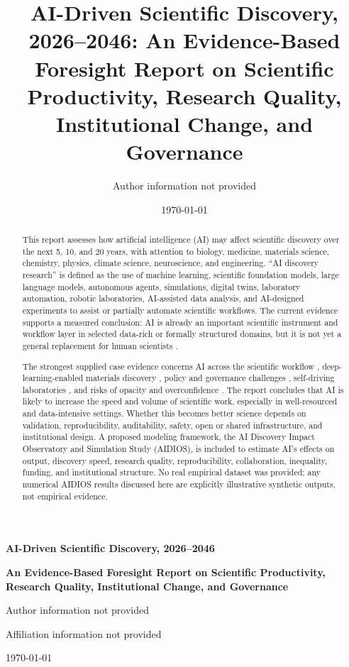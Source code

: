 \documentclass[12pt]{article}
\title{AI-Driven Scientific Discovery, 2026--2046: An Evidence-Based Foresight Report on Scientific Productivity, Research Quality, Institutional Change, and Governance}
\author{Author information not provided}
\date{\today}
\begin{document}
\onehalfspacing

\begin{titlepage}
\centering
\vspace*{1.5cm}
{\LARGE\bfseries AI-Driven Scientific Discovery, 2026--2046\par}
\vspace{0.4cm}
{\Large\bfseries An Evidence-Based Foresight Report on Scientific Productivity, Research Quality, Institutional Change, and Governance\par}
\vspace{1.5cm}
{\large Author information not provided\par}
\vspace{0.5cm}
{\large Affiliation information not provided\par}
\vfill
{\large \today\par}
\end{titlepage}

\begin{abstract}
This report assesses how artificial intelligence (AI) may affect scientific discovery over the next 5, 10, and 20 years, with attention to biology, medicine, materials science, chemistry, physics, climate science, neuroscience, and engineering. ``AI discovery research'' is defined as the use of machine learning, scientific foundation models, large language models, autonomous agents, simulations, digital twins, laboratory automation, robotic laboratories, AI-assisted data analysis, and AI-designed experiments to assist or partially automate scientific workflows. The current evidence supports a measured conclusion: AI is already an important scientific instrument and workflow layer in selected data-rich or formally structured domains, but it is not yet a general replacement for human scientists \cite{ref1,ref2,ref3,ref4}. 

The strongest supplied case evidence concerns AI across the scientific workflow \cite{ref1}, deep-learning-enabled materials discovery \cite{ref6}, policy and governance challenges \cite{ref2,ref12}, self-driving laboratories \cite{ref5}, and risks of opacity and overconfidence \cite{ref4,ref8}. The report concludes that AI is likely to increase the speed and volume of scientific work, especially in well-resourced and data-intensive settings. Whether this becomes better science depends on validation, reproducibility, auditability, safety, open or shared infrastructure, and institutional design. A proposed modeling framework, the AI Discovery Impact Observatory and Simulation Study (AIDIOS), is included to estimate AI's effects on output, discovery speed, research quality, reproducibility, collaboration, inequality, funding, and institutional structure. No real empirical dataset was provided; any numerical AIDIOS results discussed here are explicitly illustrative synthetic outputs, not empirical evidence.
\end{abstract}
\end{document}
